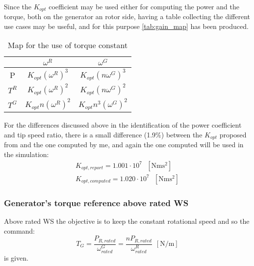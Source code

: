 Since the $K_{opt}$ coefficient may be used either for computing the power and the torque, both on the generator an rotor side, having a table collecting the different use cases may be useful, and for this purpose \autoref{tab:gain_map} has been produced.
\begin{table}[htb]
    \centering
    \caption{Map for the use of torque constant}
    \begin{tabular}{ccc}
    \toprule
         & $\omega^R$ & $\omega^G$  \\ \midrule
         P & $K_{opt} \left(\omega^{R}\right)^3$ & $K_{opt}\left(n \omega^{G}\right)^3$\\
         $T^R$ & $K_{opt} \left( \omega^{R}\right)^2$ & $K_{opt}\left(n \omega^{G}\right)^2$\\
         $T^G$ & $K_{opt} n \left(\omega^{R}\right)^2$ &  $K_{opt} n^3\left(\omega^{G}\right)^2$\\ \bottomrule
    \end{tabular}
    \label{tab:gain_map}
\end{table}

 For the differences discussed above in the identification of the power coefficient and tip speed ratio, there is a small difference (1.9$\%$) between the $K_{opt}$ proposed from \cite{DTU_Wind_Energy_Report-I-0092} and the one computed by me, and again the one computed will be used in the simulation:
 \begin{gather*}
     K_{opt, report} = 1.001 \cdot 10^7 \ \ \ \left[\si{\newton\meter\square\second}\right] \\
     K_{opt, computed} = 1.020 \cdot 10^7 \ \ \ \left[\si{\newton\meter\square\second}\right] 
 \end{gather*}

\subsubsection{Generator's torque reference above rated \acrshort{WS}}
Above rated WS the objective is to keep the constant rotational speed and so the command:
\begin{equation}
    T_G = \frac{P_{R,rated}}{\omega_{rated}^G} = \frac{nP_{R,rated}}{\omega_{rated}^R}\ \ \left[\si{\newton\per\meter}\right]
    \label{eq:T_G3}
\end{equation}
is given.

